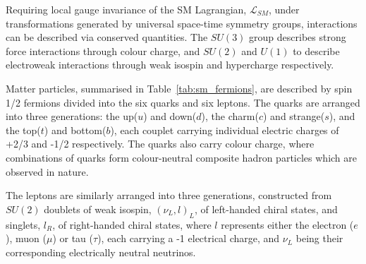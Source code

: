 Requiring local gauge invariance of the SM Lagrangian, $\mathcal{L}_{SM}$,
under
transformations generated by universal space-time symmetry groups,
interactions can be described via conserved quantities. The $SU(3)$ group
describes strong force interactions through colour charge, and $SU(2)$ and $U(1)$ to
describe electroweak interactions through weak isospin and hypercharge respectively.


Matter particles, summarised in Table~\ref{tab:sm_fermions}, are described by
spin 1/2 fermions divided into the six quarks
and six leptons. The quarks are arranged into three generations: the up($u$) and
down($d$), the charm($c$) and strange($s$), and the top($t$) and bottom($b$),
each couplet carrying
individual electric charges of +2/3 and -1/2 respectively. The quarks also carry
colour charge, where combinations of quarks form colour-neutral composite
hadron particles which are observed in nature.


The leptons are similarly arranged into three generations, constructed from
$SU(2)$
doublets of weak isospin, $(\nu_L, l)_L$, of left-handed chiral states, and
singlets, $l_R$, of right-handed chiral states, where $l$ represents either the
electron ($e$), muon ($\mu$) or tau ($\tau$), each carrying a -1 electrical
charge, and $\nu_L$ being their corresponding electrically neutral neutrinos.


